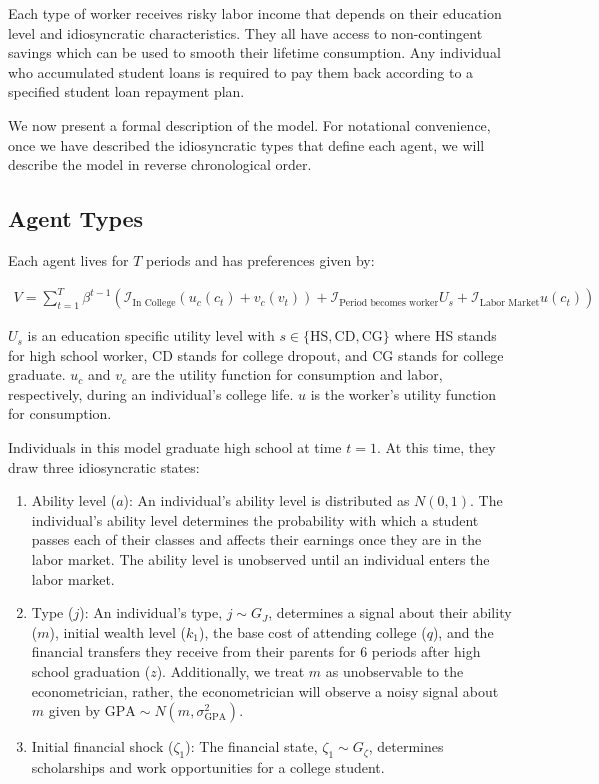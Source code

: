  Each type of worker receives risky labor income that depends on their education level and
  idiosyncratic characteristics. They all have access to non-contingent savings which can be used to
  smooth their lifetime consumption. Any individual who accumulated student loans
  is required to pay them back according to a specified student loan repayment plan.

  We now present a formal description of the model. For notational convenience, once we have
  described the idiosyncratic types that define each agent, we will describe the model in reverse
  chronological order.


\subsection{Agent Types}

  Each agent lives for $T$ periods and has preferences given by:

  \begin{align*}
    V = \sum_{t=1}^T \beta^{t-1} \left(
      \mathcal{I}_{\text{In College}} (u_c(c_t) + v_c(v_t)) +
      \mathcal{I}_{\text{Period becomes worker}} U_{s} +
      \mathcal{I}_{\text{Labor Market}} u(c_t)
    \right)
  \end{align*}

  $U_s$ is an education specific utility level with $s \in \{\text{HS}, \text{CD}, \text{CG}\}$
  where HS stands for high school worker, CD stands for college dropout, and CG stands for college
  graduate. $u_c$ and $v_c$ are the utility function for consumption and labor, respectively, during
  an individual's college life. $u$ is the worker's utility function for consumption.

  Individuals in this model graduate high school at time $t=1$. At this time, they draw three
  idiosyncratic states:

  \begin{enumerate}
    \item Ability level ($a$): An individual's ability level is distributed as $N(0, 1)$. The
    individual's ability level determines the probability with which a student passes each of their
    classes and affects their earnings once they are in the labor market. The ability level is
    unobserved until an individual enters the labor market.
    \item Type ($j$): An individual's type, $j \sim G_J$, determines a signal about their ability
    ($m$), initial wealth level ($k_1$), the base cost of attending college ($q$), and the financial
    transfers they receive from their parents for 6 periods after high school graduation ($z$).
    Additionally, we treat $m$ as unobservable to the econometrician, rather, the econometrician
    will observe a noisy signal about $m$ given by $\text{GPA} \sim N(m, \sigma^2_{\text{GPA}})$.
    \item Initial financial shock ($\zeta_1$): The financial state, $\zeta_1 \sim G_\zeta$,
    determines scholarships and work opportunities for a college student.
  \end{enumerate}



